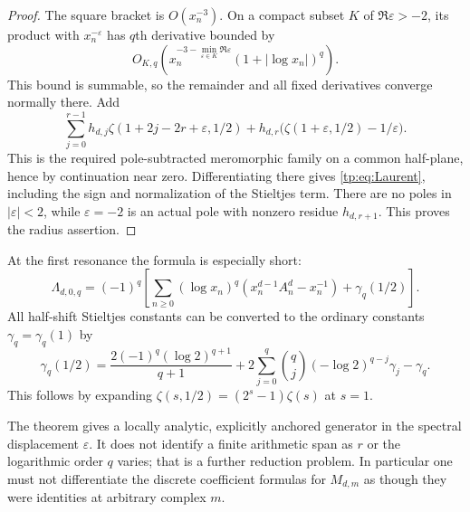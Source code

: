 \begin{proof}
The square bracket is $O(x_n^{-3})$. On a compact subset $K$ of
$\Re\varepsilon>-2$, its product with $x_n^{-\varepsilon}$ has
$q$th derivative bounded by
\[
 O_{K,q}\!\left(x_n^{-3-\min_{\varepsilon\in K}\Re\varepsilon}
                         (1+|\log x_n|)^q\right).
\]
This bound is summable, so the remainder and all fixed derivatives
converge normally there. Add
\[
 \sum_{j=0}^{r-1}h_{d,j}\zeta(1+2j-2r+\varepsilon,1/2)
 +h_{d,r}\bigl(\zeta(1+\varepsilon,1/2)-1/\varepsilon\bigr).
\]
This is the required pole-subtracted meromorphic family on a common
half-plane, hence by continuation near zero.  Differentiating there
gives \eqref{tp:eq:Laurent}, including the sign and normalization of
the Stieltjes term.  There are no poles in $|\varepsilon|<2$, while
$\varepsilon=-2$ is an actual pole with nonzero residue $h_{d,r+1}$.
This proves the radius assertion.
\end{proof}

At the first resonance the formula is especially short:
\begin{equation}\label{tp:eq:firstresonance}
 \Lambda_{d,0,q}=(-1)^q\left[
 \sum_{n\geq0}(\log x_n)^q
           \left(x_n^{d-1}A_n^d-x_n^{-1}\right)
          +\gamma_q(1/2)\right].
\end{equation}
All half-shift Stieltjes constants can be converted to the ordinary
constants $\gamma_q=\gamma_q(1)$ by
\begin{equation}\label{tp:eq:halfStieltjes}
 \gamma_q(1/2)=
 \frac{2(-1)^q(\log2)^{q+1}}{q+1}
 +2\sum_{j=0}^q\binom qj(-\log2)^{q-j}\gamma_j-\gamma_q.
\end{equation}
This follows by expanding
$\zeta(s,1/2)=(2^s-1)\zeta(s)$ at $s=1$.

The theorem gives a locally analytic, explicitly anchored generator in
the spectral displacement $\varepsilon$.  It does not identify a
finite arithmetic span as $r$ or the logarithmic order $q$ varies;
that is a further reduction problem.  In particular one must not
differentiate the discrete coefficient formulas for $M_{d,m}$ as
though they were identities at arbitrary complex $m$.
